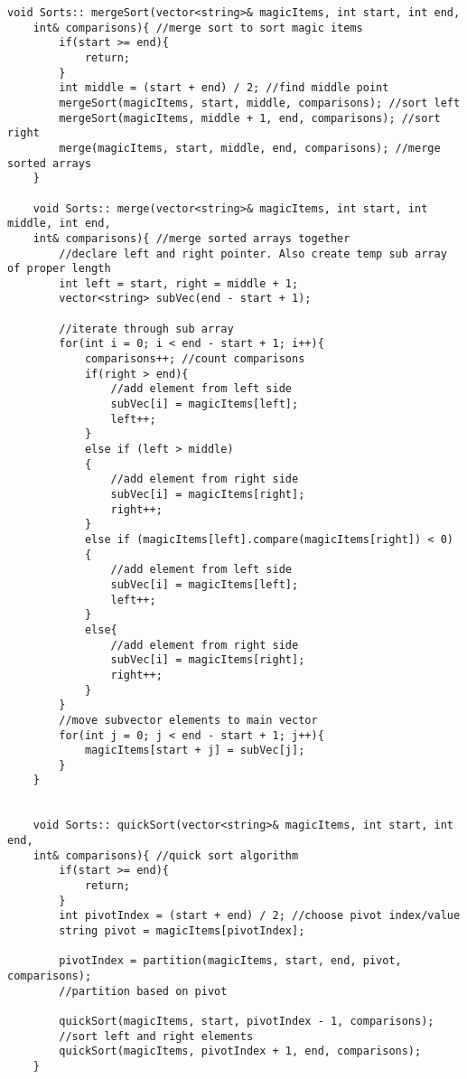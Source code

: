 \documentclass[letterpaper, 10pt,DIV=13]{scrartcl}
\numberwithin{equation}{section} %
\numberwithin{figure}{section} %
\numberwithin{table}{section} %
\begin{document}
\begin{lstlisting}[frame=single, ]
    void Sorts:: mergeSort(vector<string>& magicItems, int start, int end,
    int& comparisons){ //merge sort to sort magic items
        if(start >= end){
            return;
        }
        int middle = (start + end) / 2; //find middle point
        mergeSort(magicItems, start, middle, comparisons); //sort left
        mergeSort(magicItems, middle + 1, end, comparisons); //sort right
        merge(magicItems, start, middle, end, comparisons); //merge sorted arrays
    }
    
    void Sorts:: merge(vector<string>& magicItems, int start, int middle, int end, 
    int& comparisons){ //merge sorted arrays together
        //declare left and right pointer. Also create temp sub array of proper length
        int left = start, right = middle + 1;
        vector<string> subVec(end - start + 1);
    
        //iterate through sub array
        for(int i = 0; i < end - start + 1; i++){
            comparisons++; //count comparisons
            if(right > end){
                //add element from left side
                subVec[i] = magicItems[left];
                left++;
            }
            else if (left > middle)
            {
                //add element from right side
                subVec[i] = magicItems[right];
                right++;
            }
            else if (magicItems[left].compare(magicItems[right]) < 0)
            {
                //add element from left side
                subVec[i] = magicItems[left];
                left++;
            }
            else{
                //add element from right side
                subVec[i] = magicItems[right];
                right++;
            }
        }
        //move subvector elements to main vector
        for(int j = 0; j < end - start + 1; j++){
            magicItems[start + j] = subVec[j];
        }
    }
    
    
    void Sorts:: quickSort(vector<string>& magicItems, int start, int end,
    int& comparisons){ //quick sort algorithm
        if(start >= end){
            return;
        }
        int pivotIndex = (start + end) / 2; //choose pivot index/value
        string pivot = magicItems[pivotIndex];
    
        pivotIndex = partition(magicItems, start, end, pivot, comparisons);
        //partition based on pivot
    
        quickSort(magicItems, start, pivotIndex - 1, comparisons); 
        //sort left and right elements
        quickSort(magicItems, pivotIndex + 1, end, comparisons);
    }
    

\end{lstlisting}
\end{document}
